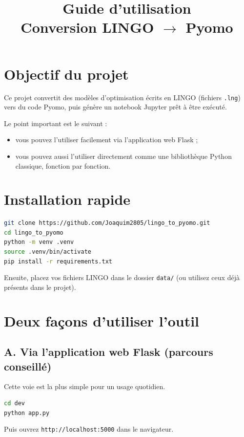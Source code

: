 \documentclass[11pt,a4paper]{article}
\title{Guide d'utilisation\\\large Conversion LINGO $\rightarrow$ Pyomo}
\begin{document}
\maketitle

\section{Objectif du projet}
Ce projet convertit des modèles d'optimisation écrits en LINGO (fichiers \texttt{.lng}) vers du code Pyomo, puis génère un notebook Jupyter prêt à être exécuté.

\medskip
\noindent
Le point important est le suivant :
\begin{itemize}[leftmargin=1.2cm]
  \item vous pouvez l'utiliser facilement via l'application web Flask ;
  \item vous pouvez aussi l'utiliser directement comme une bibliothèque Python classique, fonction par fonction.
\end{itemize}

\section{Installation rapide}
\begin{lstlisting}[language=bash]
git clone https://github.com/Joaquim2805/lingo_to_pyomo.git
cd lingo_to_pyomo
python -m venv .venv
source .venv/bin/activate
pip install -r requirements.txt
\end{lstlisting}

\noindent
Ensuite, placez vos fichiers LINGO dans le dossier \texttt{data/} (ou utilisez ceux déjà présents dans le projet).

\section{Deux façons d'utiliser l'outil}
\subsection{A. Via l'application web Flask (parcours conseillé)}
Cette voie est la plus simple pour un usage quotidien.

\begin{lstlisting}[language=bash]
cd dev
python app.py
\end{lstlisting}

Puis ouvrez \texttt{http://localhost:5000} dans le navigateur.
\end{document}
